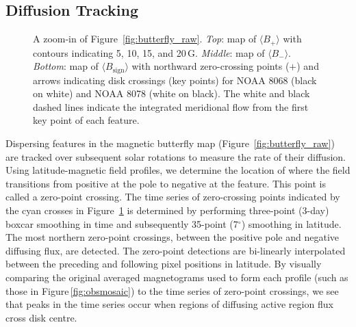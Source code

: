 \subsection{Diffusion Tracking}\label{sect:difftrack}

\begin{figure}[!t]    %
\caption[A zoom-in of Figure~\ref{fig:butterfly_raw}.]{A zoom-in of Figure~\ref{fig:butterfly_raw}. \emph{Top}: map of $\langle B_{+} \rangle$ with contours indicating 5, 10, 15, and 20\,G. \emph{Middle}: map of $\langle B_{-} \rangle$. \emph{Bottom}: map of $\langle B_{\mathrm{sign}} \rangle$ with northward zero-crossing points ($+$) and arrows indicating disk crossings (key points) for NOAA 8068 (black on white) and NOAA 8078 (white on black). The white and black dashed lines indicate the integrated meridional flow from the first key point of each feature.
}
   \label{fig:butterfly_zoom}
   \end{figure}

Dispersing features in the magnetic butterfly map (Figure~\ref{fig:butterfly_raw}) are tracked over subsequent solar rotations to measure the rate of their diffusion. Using latitude-magnetic field profiles, we determine the location of where the field transitions from positive at the pole to negative at the feature. This point is called a zero-point crossing.
The time series of zero-crossing points indicated by the cyan crosses in Figure~\ref{fig:butterfly_zoom} is determined by performing three-point (3-day) boxcar smoothing in time and subsequently 35-point (7$^\circ$) smoothing in latitude. The most northern zero-point crossings, between the positive pole and negative diffusing flux, are detected. The zero-point detections are bi-linearly interpolated between the preceding and following pixel positions in latitude. By visually comparing the original averaged magnetograms used to form each profile (such as those in Figure\,\ref{fig:obsmosaic}) to the time series of zero-point crossings, we see that peaks in the time series occur when regions of diffusing active region flux cross disk centre. 

